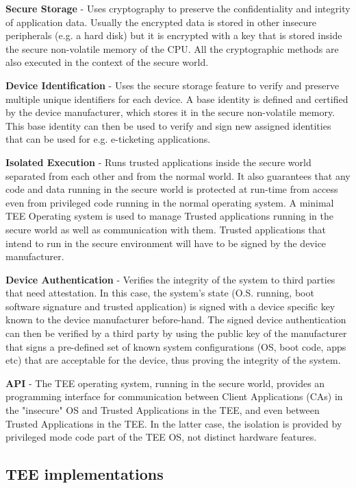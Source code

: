 \documentclass[cameraready]{cseminar}
\begin{document}
\textbf{Secure Storage} - Uses cryptography to preserve the confidentiality and integrity of application data. Usually the encrypted data is stored in other insecure peripherals (e.g. a hard disk) but it is encrypted with a key that is stored inside the secure non-volatile memory of the CPU. All the cryptographic methods are also executed in the context of the secure world.

\textbf{Device Identification} - Uses the secure storage feature to verify and preserve multiple unique identifiers for each device. A base identity is defined and certified by the device manufacturer, which stores it in the secure non-volatile memory. This base identity can then be used to verify and sign new assigned identities that can be used for e.g. e-ticketing applications.

\textbf{Isolated Execution} - Runs trusted applications inside the secure world separated from each other and from the normal world. It also guarantees that any code and data running in the secure world is protected at run-time from access even from privileged code running in the normal operating system. A minimal TEE Operating system is used to manage Trusted applications running in the secure world as well as communication with them. Trusted applications that intend to run in the secure environment will have to be signed by the device manufacturer.

\textbf{Device Authentication} - Verifies the integrity of the system to third parties that need attestation. In this case, the system's state (O.S. running, boot software signature and trusted application) is signed with a device specific key known to the device manufacturer before-hand. The signed device authentication can then be verified by a third party by using the public key of the manufacturer that signs a pre-defined set of known system configurations (OS, boot code, apps etc) that are acceptable for the device, thus proving the integrity of the system.

\textbf{API} - The TEE operating system, running in the secure world, provides an programming interface for communication between Client Applications (CAs) in the "insecure" OS and Trusted Applications in the TEE, and even between Trusted Applications in the TEE. In the latter case, the isolation is provided by privileged mode code part of the TEE OS, not distinct hardware features.


\subsection{TEE implementations}
\label{teeoss}
\end{document}
